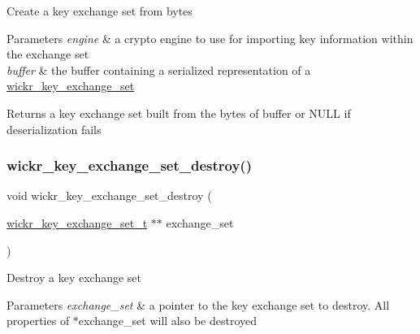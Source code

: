 Create a key exchange set from bytes


\begin{DoxyParams}{Parameters}
{\em engine} & a crypto engine to use for importing key information within the exchange set \\
\hline
{\em buffer} & the buffer containing a serialized representation of a \textquotesingle{}\mbox{\hyperlink{structwickr__key__exchange__set}{wickr\+\_\+key\+\_\+exchange\+\_\+set}}\textquotesingle{} \\
\hline
\end{DoxyParams}
\begin{DoxyReturn}{Returns}
a key exchange set built from the bytes of \textquotesingle{}buffer\textquotesingle{} or N\+U\+LL if deserialization fails 
\end{DoxyReturn}
\mbox{\label{group__wickr__key__exchange__set_gadaff24901ec60f83216c03c13bff3e2f}} 
\subsubsection{\texorpdfstring{wickr\+\_\+key\+\_\+exchange\+\_\+set\+\_\+destroy()}{wickr\_key\_exchange\_set\_destroy()}}
{\footnotesize\ttfamily void wickr\+\_\+key\+\_\+exchange\+\_\+set\+\_\+destroy (\begin{DoxyParamCaption}\item[{\mbox{\hyperlink{structwickr__key__exchange__set}{wickr\+\_\+key\+\_\+exchange\+\_\+set\+\_\+t}} $\ast$$\ast$}]{exchange\+\_\+set }\end{DoxyParamCaption})}

Destroy a key exchange set


\begin{DoxyParams}{Parameters}
{\em exchange\+\_\+set} & a pointer to the key exchange set to destroy. All properties of \textquotesingle{}$\ast$exchange\+\_\+set\textquotesingle{} will also be destroyed \\
\hline
\end{DoxyParams}
\mbox{\label{group__wickr__key__exchange__set_gae071583943c5c6abe8acc4bcfba032ba}} 
